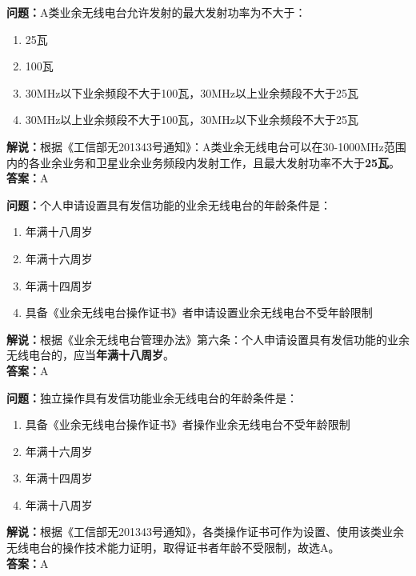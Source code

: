 \textbf{问题：}A类业余无线电台允许发射的最大发射功率为不大于：
\begin{enumerate}[label=\Alph*), leftmargin=1cm]
	\item 25瓦
	\item 100瓦
	\item 30MHz以下业余频段不大于100瓦，30MHz以上业余频段不大于25瓦
	\item 30MHz以上业余频段不大于100瓦，30MHz以下业余频段不大于25瓦
\end{enumerate}
\textbf{解说：}根据《工信部无201343号通知》：A类业余无线电台可以在30-1000MHz范围内的各业余业务和卫星业余业务频段内发射工作，且最大发射功率不大于\textbf{25瓦}。\\\textbf{答案：}A

\textbf{问题：}个人申请设置具有发信功能的业余无线电台的年龄条件是：
\begin{enumerate}[label=\Alph*), leftmargin=1cm]
	\item 年满十八周岁
	\item 年满十六周岁
	\item 年满十四周岁
	\item 具备《业余无线电台操作证书》者申请设置业余无线电台不受年龄限制
\end{enumerate}
\textbf{解说：}根据《业余无线电台管理办法》第六条：个人申请设置具有发信功能的业余无线电台的，应当\textbf{年满十八周岁}。\\\textbf{答案：}A

\textbf{问题：}独立操作具有发信功能业余无线电台的年龄条件是：
\begin{enumerate}[label=\Alph*), leftmargin=1cm]
	\item 具备《业余无线电台操作证书》者操作业余无线电台不受年龄限制
	\item 年满十六周岁
	\item 年满十四周岁
	\item 年满十八周岁
\end{enumerate}
\textbf{解说：}根据《工信部无201343号通知》，各类操作证书可作为设置、使用该类业余无线电台的操作技术能力证明，取得证书者年龄不受限制，故选A。\\\textbf{答案：}A

